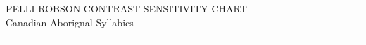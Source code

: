 \documentclass{article}
\newcommand{\chartheader}{
    \centering
    \vspace*{-1cm}
    {\headerfont\Huge PELLI-ROBSON CONTRAST SENSITIVITY CHART}\\[0.5cm]
    {\headerfont\large Canadian Aborignal Syllabics}\\[0.3cm]
    \rule{\textwidth}{1pt}\\[0.5cm]
}
\begin{document}
\chartheader

\begin{tabular}{c c c c c}
\end{tabular}
\end{document}
